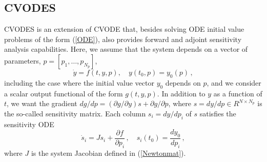 \subsection{CVODES}\label{ss:cvodes}

CVODES is an extension of CVODE that, besides solving ODE initial
value problems of the form (\ref{ODE}), also provides forward and 
adjoint sensitivity analysis capabilities.
%
Here, we assume that the system depends on a vector of parameters,
$p = [p_1,\ldots,p_{N_p}]$,
\begin{equation}\label{e:ODE_with_p}
\dot{y} = f(t,y,p), \quad y(t_0,p) = y_0(p) \, ,
\end{equation}
including the case where the initial value vector $y_0$ depends on $p$,
and we consider a scalar output functional of the form $g(t,y,p)$.
%
In addition to $y$ as a function of $t$, we want the gradient 
$d g / d p  = ({\partial g}/{\partial y}) s + {\partial g}/{\partial p}$, 
where $s = dy/dp \in R^{N \times N_p}$ is the so-called sensitivity matrix.
%
Each column $s_i = d y / d p_i$ of $s$ satisfies the sensitivity ODE
\begin{equation}\label{e:fwdODE}
\dot{s}_i = J s_i + \frac{\partial f}{\partial p_i} \, , 
\quad s_i(t_0) = \frac{d y_0}{d p_i} \, ,
\end{equation}
where $J$ is the system Jacobian defined in (\ref{Newtonmat}).

